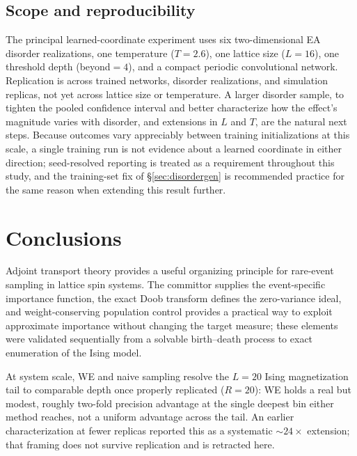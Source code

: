 \documentclass[a4paper,fleqn]{cas-sc}
\begin{document}
\subsection{Scope and reproducibility}\label{sec:scope}
The principal learned-coordinate experiment uses six two-dimensional EA disorder
realizations, one temperature ($T=2.6$), one lattice size ($L=16$), one threshold depth
(beyond$=4$), and a compact periodic convolutional network. Replication is across trained
networks, disorder realizations, and simulation replicas, not yet across lattice size or
temperature. A larger disorder sample, to tighten the pooled confidence interval and better
characterize how the effect's magnitude varies with disorder, and extensions in $L$ and $T$,
are the natural next steps. Because outcomes vary appreciably between training initializations
at this scale, a single training run is not evidence about a learned coordinate in either
direction; seed-resolved reporting is treated as a requirement throughout this study, and the
training-set fix of \S\ref{sec:disordergen} is recommended practice for the same reason when
extending this result further.

\FloatBarrier

\section{Conclusions}\label{sec:conclusions}

Adjoint transport theory provides a useful organizing principle for rare-event sampling in
lattice spin systems. The committor supplies the event-specific importance function, the exact
Doob transform defines the zero-variance ideal, and weight-conserving population control
provides a practical way to exploit approximate importance without changing the target
measure; these elements were validated sequentially from a solvable birth--death process to
exact enumeration of the Ising model.

At system scale, WE and naive sampling resolve the $L=20$ Ising magnetization tail to
comparable depth once properly replicated ($R=20$): WE holds a real but modest, roughly
two-fold precision advantage at the single deepest bin either method reaches, not a uniform
advantage across the tail. An earlier characterization at fewer replicas reported this as a
systematic $\sim24\times$ extension; that framing does not survive replication and is
retracted here.
\end{document}
